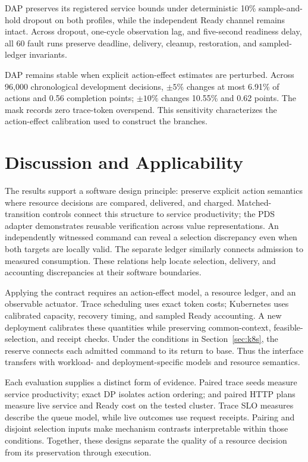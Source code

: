 \documentclass[acmsmall,screen,review,anonymous]{acmart}
\begin{document}
DAP preserves its registered service bounds under deterministic 10\%
sample-and-hold dropout on both profiles, while the independent Ready channel
remains intact. Across dropout, one-cycle observation lag, and five-second
readiness delay, all 60 fault runs preserve deadline, delivery, cleanup,
restoration, and sampled-ledger invariants.

DAP remains stable when explicit action-effect estimates are perturbed. Across
96,000 chronological development decisions, \(\pm5\%\) changes at most 6.91\%
of actions and 0.56 completion points; \(\pm10\%\) changes 10.55\% and 0.62
points. The mask records zero trace-token overspend. This sensitivity characterizes the action-effect calibration used to
construct the branches.

\section{Discussion and Applicability}

The results support a software design principle: preserve explicit action
semantics where resource decisions are compared, delivered, and charged.
Matched-transition controls connect this structure to service productivity;
the PDS adapter demonstrates reusable verification across value
representations. An independently witnessed command can reveal a selection
discrepancy even when both targets are locally valid. The separate ledger
similarly connects admission to measured consumption. These relations help
locate selection, delivery, and accounting discrepancies at their software
boundaries.

Applying the contract requires an action-effect model, a resource ledger,
and an observable actuator. Trace scheduling uses exact token costs;
Kubernetes uses calibrated capacity, recovery timing, and sampled Ready
accounting. A new deployment calibrates these quantities while preserving
common-context, feasible-selection, and receipt checks. Under the conditions
in Section~\ref{sec:k8s}, the reserve connects each admitted command to its
return to base. Thus the interface transfers with workload- and
deployment-specific models and resource semantics.

Each evaluation supplies a distinct form of evidence. Paired trace seeds
measure service productivity; exact DP isolates action ordering; and paired
HTTP plans measure live service and Ready cost on the tested cluster.
Trace SLO measures describe the queue model, while live outcomes use request
receipts. Pairing and disjoint selection inputs make mechanism contrasts
interpretable within those conditions. Together, these designs separate
the quality of a resource decision from its preservation through execution.
\end{document}
